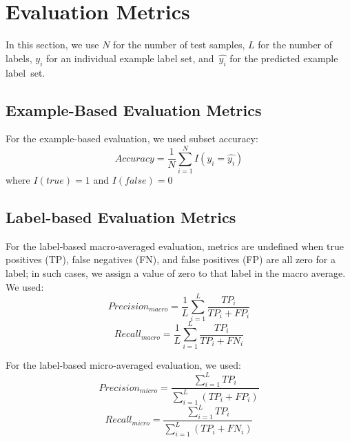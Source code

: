 \documentclass[make,article,accept,pdftex,moreauthors]{Definitions/mdpi}
\begin{document}
\section[\appendixname~\thesection]{Evaluation Metrics}
\label{sec:evaluation_metrics}
In this section, we use $N$ for the number of test samples, $L$ for the number of labels, $y_i$ for an individual example label set, and~$\hat{y_i}$ for the predicted example label~set.
\subsection[\appendixname~\thesubsection]{Example-Based Evaluation Metrics}
For the example-based evaluation, we used subset accuracy:
\begin{equation}
  Accuracy = \frac{1}{N}\sum_{i=1}^{N}I( y_i = \hat{y_i})
\end{equation}
where  $I(true) = 1$ and $I(false) = 0$

\subsection[\appendixname~\thesubsection]{Label-based Evaluation Metrics}
For the label‑based macro‑averaged evaluation, metrics are undefined when true positives (TP), false negatives (FN), and false positives (FP) are all zero for a label; in such cases, we assign a value of zero to that label in the macro average. We used:
\begin{equation}
  Precision_{macro} = \frac{1}{L}\sum_{i=1}^{L}\frac{TP_i}{TP_i + FP_i}
\end{equation}
\begin{equation}
  Recall_{macro} = \frac{1}{L}\sum_{i=1}^{L}\frac{TP_i}{TP_i + FN_i}
\end{equation}

For the label-based micro-averaged evaluation, we used:
\begin{equation}
  Precision_{micro} = \frac{\sum_{i=1}^{L} TP_i}{\sum_{i=1}^{L} (TP_i + FP_i)}
\end{equation}
\begin{equation}
  Recall_{micro} = \frac{\sum_{i=1}^{L} TP_i}{\sum_{i=1}^{L} (TP_i + FN_i)}
\end{equation}
\end{document}
